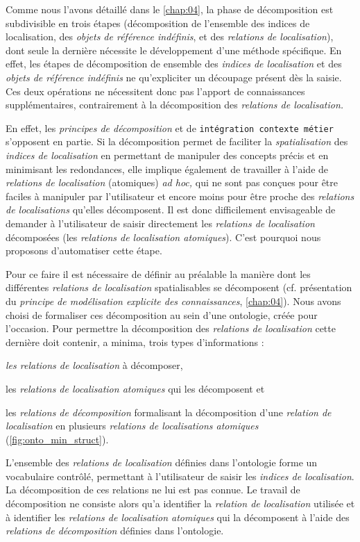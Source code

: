 Comme nous l'avons détaillé dans le \autoref{chap:04}, la phase de
décomposition est subdivisible en trois étapes (décomposition de
l'ensemble des indices de localisation, des \emph{objets de référence
  indéfinis}, et des \emph{relations de localisation}), dont seule la
dernière nécessite le développement d'une méthode spécifique. En
effet, les étapes de décomposition de ensemble des \emph{indices de
  localisation} et des \emph{objets de référence indéfinis} ne
qu'expliciter un découpage présent dès la saisie. Ces deux opérations
ne nécessitent donc pas l'apport de connaissances supplémentaires,
contrairement à la décomposition des \emph{relations de localisation.}

En effet, les \emph{principes de décomposition} et de
\texttt{intégration contexte métier} s'opposent en partie. Si la
décomposition permet de faciliter la \emph{spatialisation} des
\emph{indices de localisation} en permettant de manipuler des concepts
précis et en minimisant les redondances, elle implique également de
travailler à l'aide de \emph{relations de localisation} (atomiques)
\emph{ad hoc,} qui ne sont pas conçues pour être faciles à manipuler
par l'utilisateur et encore moins pour être proche des \emph{relations
  de localisations} qu'elles décomposent. Il est donc difficilement
envisageable de demander à l'utilisateur de saisir directement les
\emph{relations de localisation} décomposées (\ie les \emph{relations
  de localisation atomiques}). C'est pourquoi nous proposons
d'automatiser cette étape.

Pour ce faire il est nécessaire de définir au préalable la manière
dont les différentes \emph{relations de localisation} spatialisables
se décomposent (cf. présentation du \emph{principe de modélisation
  explicite des connaissances}, \autoref{chap:04}). Nous avons choisi
de formaliser ces décomposition au sein d'une ontologie, créée pour
l'occasion. Pour permettre la décomposition des \emph{relations de
  localisation} cette dernière doit contenir, a minima, trois types
d'informations :
%
\begin{enumerate*}[label=(\alph*)]
\item \emph{les relations de localisation} à décomposer,
\item les \emph{relations de localisation atomiques} qui les
  décomposent et
\item les \emph{relations de décomposition} formalisant la
  décomposition d'une \emph{relation de localisation} en plusieurs
  \emph{relations de localisations atomiques}
  (\autoref{fig:onto_min_struct}).
\end{enumerate*}
%
L'ensemble des \emph{relations de localisation} définies dans
l'ontologie forme un vocabulaire contrôlé, permettant à l'utilisateur
de saisir les \emph{indices de localisation}. La décomposition de ces
relations ne lui est pas connue. Le travail de décomposition ne
consiste alors qu'a identifier la \emph{relation de localisation}
utilisée et à identifier les \emph{relations de localisation
  atomiques} qui la décomposent à l'aide des \emph{relations de
  décomposition} définies dans l'ontologie.

